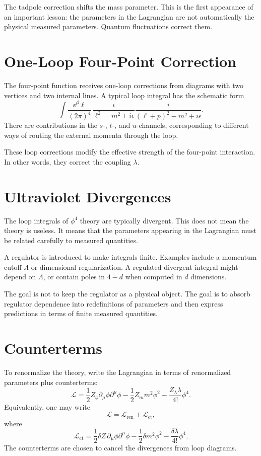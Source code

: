 The tadpole correction shifts the mass parameter. This is the first appearance
of an important lesson: the parameters in the Lagrangian are not automatically
the physical measured parameters. Quantum fluctuations correct them.

\section{One-Loop Four-Point Correction}

The four-point function receives one-loop corrections from diagrams with two
vertices and two internal lines. A typical loop integral has the schematic form
\[
    \int\frac{\dd^4\ell}{(2\pi)^4}\,
    \frac{i}{\ell^2-m^2+i\epsilon}
    \frac{i}{(\ell+p)^2-m^2+i\epsilon}.
\]
There are contributions in the \(s\)-, \(t\)-, and \(u\)-channels, corresponding
to different ways of routing the external momenta through the loop.

These loop corrections modify the effective strength of the four-point
interaction. In other words, they correct the coupling \(\lambda\).

\section{Ultraviolet Divergences}

The loop integrals of \(\phi^4\) theory are typically divergent. This does not
mean the theory is useless. It means that the parameters appearing in the
Lagrangian must be related carefully to measured quantities.

A regulator is introduced to make integrals finite. Examples include a momentum
cutoff \(\Lambda\) or dimensional regularization. A regulated divergent integral
might depend on \(\Lambda\), or contain poles in \(4-d\) when computed in
\(d\) dimensions.

The goal is not to keep the regulator as a physical object. The goal is to
absorb regulator dependence into redefinitions of parameters and then express
predictions in terms of finite measured quantities.

\section{Counterterms}

To renormalize the theory, write the Lagrangian in terms of renormalized
parameters plus counterterms:
\[
    \mathcal{L}
    = \frac{1}{2}Z_\phi\partial_\mu\phi\partial^\mu\phi
      -\frac{1}{2}Z_m m^2\phi^2
      -\frac{Z_\lambda\lambda}{4!}\phi^4.
\]
Equivalently, one may write
\[
    \mathcal{L}
    = \mathcal{L}_{\mathrm{ren}}+\mathcal{L}_{\mathrm{ct}},
\]
where
\[
    \mathcal{L}_{\mathrm{ct}}
    = \frac{1}{2}\delta Z\,\partial_\mu\phi\partial^\mu\phi
      -\frac{1}{2}\delta m^2\phi^2
      -\frac{\delta\lambda}{4!}\phi^4.
\]
The counterterms are chosen to cancel the divergences from loop diagrams.


